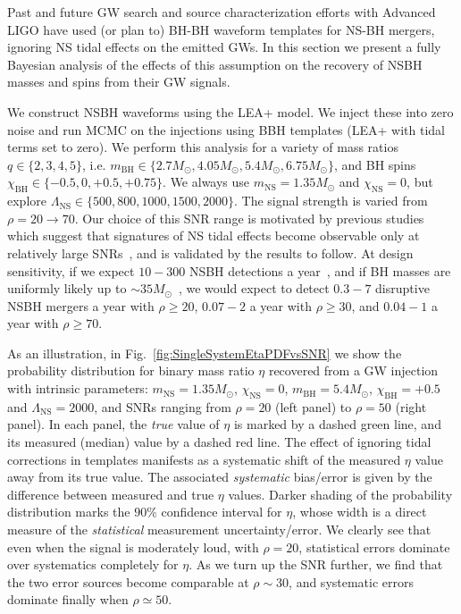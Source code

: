 \documentclass[aps,prd,amsmath,floats,floatfix, twocolumn,
superscriptaddress,nofootinbib,showpacs]{revtex4-1}
\newcommand{\lambdans}{\Lambda_\mathrm{NS}}
\newcommand{\chibh}{\chi_\mathrm{BH}}
\newcommand{\chins}{\chi_\mathrm{NS}}
\newcommand{\mbh}{m_\mathrm{BH}}
\newcommand{\mns}{m_\mathrm{NS}}
\begin{document}
% 
% 
Past and future GW search and source characterization efforts with Advanced LIGO
have used (or plan to) BH-BH waveform templates for NS-BH mergers, ignoring
NS tidal effects on the emitted GWs. In this section we present a fully
Bayesian analysis of the effects of this assumption on the recovery of NSBH
masses and spins from their GW signals.


We construct NSBH waveforms using the LEA+ model. We inject these into zero
noise and run MCMC on the injections using BBH templates (LEA+ with tidal terms
set to zero). We perform this analysis for a variety of mass ratios
$q\in\{2,3,4,5\}$, i.e. $\mbh\in\{2.7M_\odot, 4.05M_\odot, 5.4M_\odot, 6.75M_\odot\}$,
and BH spins $\chibh\in\{-0.5, 0, +0.5, +0.75\}$. We always use $\mns=1.35M_\odot$ and
$\chins=0$, but explore $\lambdans\in\{500, 800, 1000, 1500, 2000\}$. The signal
strength is varied from $\rho=20\rightarrow70$. Our choice of this SNR range is
motivated by previous studies which suggest that signatures of NS tidal effects
become observable only at relatively large SNRs~\cite{Lackey:2013axa}, and is validated
by the results to follow. At design sensitivity, if we expect $10-300$ NSBH detections 
a year~\cite{Abadie:2010cfa}, and if BH masses are uniformly likely up to
$\sim 35M_\odot$~\cite{LIGOVirgo2016a}, we would expect to detect $0.3-7$ disruptive
NSBH mergers a year with $\rho\geq 20$, $0.07-2$ a year with $\rho\geq 30$, and $0.04-1$ a
year with $\rho\geq 70$.



As an illustration, in Fig.~\ref{fig:SingleSystemEtaPDFvsSNR} we show the
probability distribution for binary mass ratio $\eta$ recovered from a GW
injection with intrinsic parameters: $\mns=1.35M_\odot$, $\chins=0$,
$\mbh=5.4M_\odot$, $\chibh=+0.5$ and $\lambdans=2000$, and SNRs ranging
from $\rho=20$ (left panel) to $\rho=50$ (right panel). In each panel, the
{\it true} value of $\eta$ is marked by a dashed green line, and its measured
(median) value by a dashed red line. The effect of ignoring tidal corrections
in templates manifests as a systematic shift of the measured $\eta$ value away
from its true value. The associated {\it systematic} bias/error is given by the
difference between measured and true $\eta$ values. Darker shading of the
probability distribution marks the $90\%$ confidence interval for $\eta$, whose
width is a direct measure of the {\it statistical} measurement uncertainty/error.
% 
We clearly see that even when the signal is moderately loud, with $\rho=20$,
statistical errors dominate over systematics completely for $\eta$.
As we turn up the SNR
further, we find that the two error sources become comparable at $\rho\sim 30$,
and systematic errors dominate finally when $\rho\simeq 50$.
\end{document}
